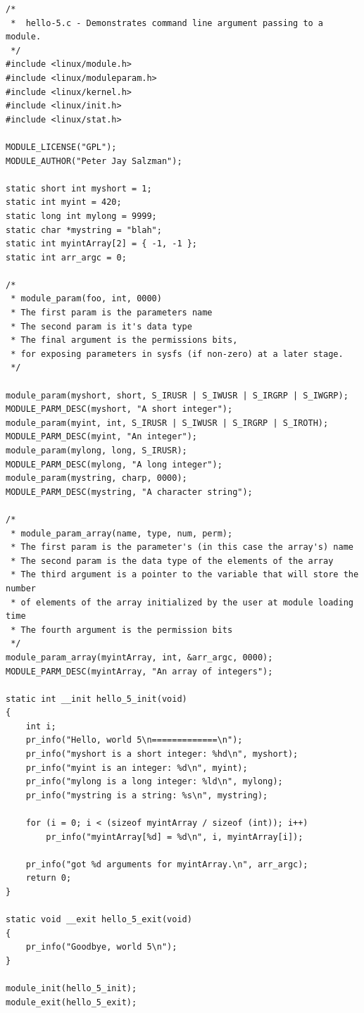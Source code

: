 \documentclass[11pt]{article}
\begin{document}
\begin{verbatim}
/*
 *  hello-5.c - Demonstrates command line argument passing to a module.
 */
#include <linux/module.h>
#include <linux/moduleparam.h>
#include <linux/kernel.h>
#include <linux/init.h>
#include <linux/stat.h>

MODULE_LICENSE("GPL");
MODULE_AUTHOR("Peter Jay Salzman");

static short int myshort = 1;
static int myint = 420;
static long int mylong = 9999;
static char *mystring = "blah";
static int myintArray[2] = { -1, -1 };
static int arr_argc = 0;

/*
 * module_param(foo, int, 0000)
 * The first param is the parameters name
 * The second param is it's data type
 * The final argument is the permissions bits,
 * for exposing parameters in sysfs (if non-zero) at a later stage.
 */

module_param(myshort, short, S_IRUSR | S_IWUSR | S_IRGRP | S_IWGRP);
MODULE_PARM_DESC(myshort, "A short integer");
module_param(myint, int, S_IRUSR | S_IWUSR | S_IRGRP | S_IROTH);
MODULE_PARM_DESC(myint, "An integer");
module_param(mylong, long, S_IRUSR);
MODULE_PARM_DESC(mylong, "A long integer");
module_param(mystring, charp, 0000);
MODULE_PARM_DESC(mystring, "A character string");

/*
 * module_param_array(name, type, num, perm);
 * The first param is the parameter's (in this case the array's) name
 * The second param is the data type of the elements of the array
 * The third argument is a pointer to the variable that will store the number
 * of elements of the array initialized by the user at module loading time
 * The fourth argument is the permission bits
 */
module_param_array(myintArray, int, &arr_argc, 0000);
MODULE_PARM_DESC(myintArray, "An array of integers");

static int __init hello_5_init(void)
{
    int i;
    pr_info("Hello, world 5\n=============\n");
    pr_info("myshort is a short integer: %hd\n", myshort);
    pr_info("myint is an integer: %d\n", myint);
    pr_info("mylong is a long integer: %ld\n", mylong);
    pr_info("mystring is a string: %s\n", mystring);

    for (i = 0; i < (sizeof myintArray / sizeof (int)); i++)
        pr_info("myintArray[%d] = %d\n", i, myintArray[i]);

    pr_info("got %d arguments for myintArray.\n", arr_argc);
    return 0;
}

static void __exit hello_5_exit(void)
{
    pr_info("Goodbye, world 5\n");
}

module_init(hello_5_init);
module_exit(hello_5_exit);
\end{verbatim}
\end{document}
